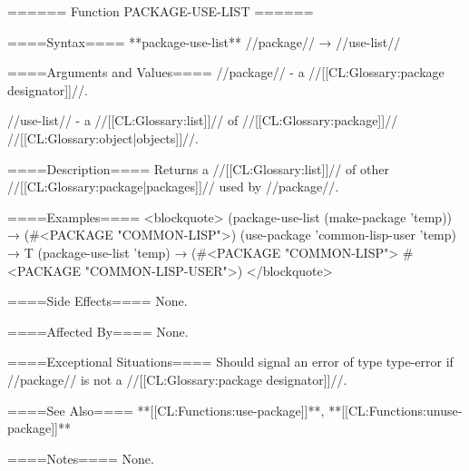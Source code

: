 ====== Function PACKAGE-USE-LIST ======

====Syntax====
**package-use-list** //package// → //use-list//

====Arguments and Values====
//package// - a //[[CL:Glossary:package designator]]//.

//use-list// - a //[[CL:Glossary:list]]// of //[[CL:Glossary:package]]// //[[CL:Glossary:object|objects]]//.

====Description====
Returns a //[[CL:Glossary:list]]// of other //[[CL:Glossary:package|packages]]// used by //package//.

====Examples====
<blockquote> (package-use-list (make-package 'temp)) → (#<PACKAGE "COMMON-LISP">) (use-package 'common-lisp-user 'temp) → T (package-use-list 'temp) → (#<PACKAGE "COMMON-LISP"> #<PACKAGE "COMMON-LISP-USER">) </blockquote>

====Side Effects====
None.

====Affected By====
None.

====Exceptional Situations====
Should signal an error of type type-error if //package// is not a //[[CL:Glossary:package designator]]//.

====See Also====
**[[CL:Functions:use-package]]**, **[[CL:Functions:unuse-package]]**

====Notes====
None.

